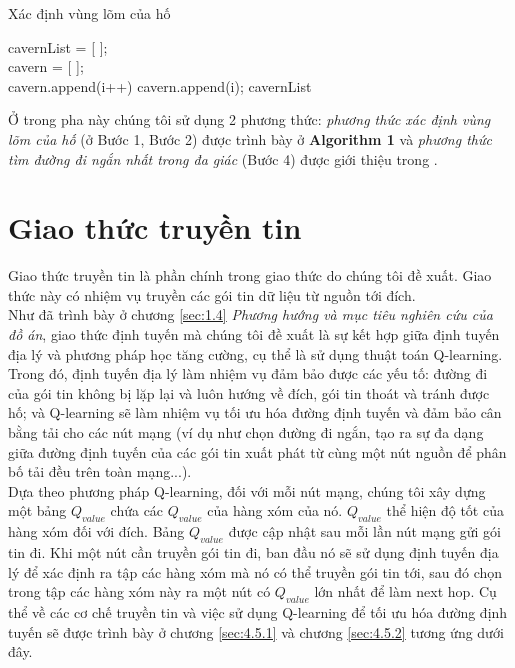 \documentclass[12pt]{report}
\begin{document}
\begin{center}
\begin{algorithm}[H]
\setcounter{AlgoLine}{0}
\caption{Xác định vùng lõm của hố}\label{cavedetermine}
cavernList = [ ];\\

 {
	cavern = [ ];\\
	 {
	cavern.append(i++)
	 {
		cavern.append(i);
		}
	}
}
\Return cavernList
\end{algorithm}
\end{center}
Ở trong pha này chúng tôi sử dụng 2 phương thức: \textit{phương thức xác định vùng lõm của hố} (ở Bước 1, Bước 2)  được trình bày ở \textbf{Algorithm 1} và \textit{phương thức tìm đường đi ngắn nhất trong đa giác} (Bước 4) được giới thiệu trong \cite{shortestpath}.
\section{Giao thức truyền tin}
\label{sec:4.5}
Giao thức truyền tin là phần chính trong giao thức do chúng tôi đề xuất. Giao thức này có nhiệm vụ truyền các gói tin dữ liệu từ nguồn tới đích. \\
Như đã trình bày ở chương \ref{sec:1.4} \textit{Phương hướng và mục tiêu nghiên cứu của đồ án}, giao thức định tuyến mà chúng tôi đề xuất là sự kết hợp giữa định tuyến địa lý và phương pháp học tăng cường, cụ thể là sử dụng thuật toán Q-learning. Trong đó, định tuyến địa lý làm nhiệm vụ đảm bảo được các yếu tố: đường đi của gói tin không bị lặp lại và luôn hướng về đích, gói tin thoát và tránh được hố; và Q-learning sẽ làm nhiệm vụ tối ưu hóa đường định tuyến và đảm bảo cân bằng tải cho các nút mạng (ví dụ như chọn đường đi ngắn, tạo ra sự đa dạng giữa đường định tuyến của các gói tin xuất phát từ cùng một nút nguồn để phân bố tải đều trên toàn mạng...).\\
Dựa theo phương pháp Q-learning, đối với mỗi nút mạng, chúng tôi xây dựng một bảng $Q_{value}$ chứa các $Q_{value}$ của hàng xóm của nó. $Q_{value}$ thể hiện độ tốt của hàng xóm đối với đích. Bảng $Q_{value}$ được cập nhật sau mỗi lần nút mạng gửi gói tin đi. Khi một nút cần truyền gói tin đi, ban đầu nó sẽ sử dụng định tuyến địa lý để xác định ra tập các hàng xóm mà nó có thể truyền gói tin tới, sau đó chọn trong tập các hàng xóm này ra một nút có $Q_{value}$ lớn nhất để làm next hop. Cụ thể về các cơ chế truyền tin và việc sử dụng Q-learning để tối ưu hóa đường định tuyến sẽ được trình bày ở chương \ref{sec:4.5.1} và chương \ref{sec:4.5.2} tương ứng dưới đây.
\end{document}
